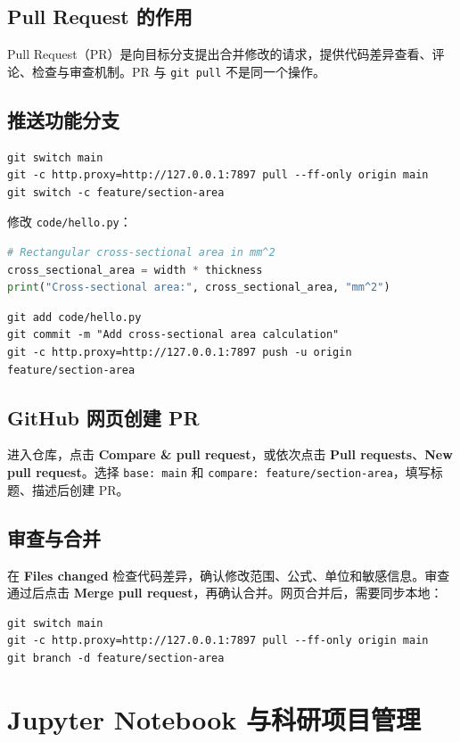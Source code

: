 \subsection{Pull Request 的作用}
Pull Request（PR）是向目标分支提出合并修改的请求，提供代码差异查看、评论、检查与审查机制。PR 与 \texttt{git pull} 不是同一个操作。
\subsection{推送功能分支}
\begin{lstlisting}
git switch main
git -c http.proxy=http://127.0.0.1:7897 pull --ff-only origin main
git switch -c feature/section-area
\end{lstlisting}
修改 \texttt{code/hello.py}：
\begin{lstlisting}[language=Python]
# Rectangular cross-sectional area in mm^2
cross_sectional_area = width * thickness
print("Cross-sectional area:", cross_sectional_area, "mm^2")
\end{lstlisting}
\begin{lstlisting}
git add code/hello.py
git commit -m "Add cross-sectional area calculation"
git -c http.proxy=http://127.0.0.1:7897 push -u origin feature/section-area
\end{lstlisting}
\subsection{GitHub 网页创建 PR}
进入仓库，点击 \textbf{Compare \& pull request}，或依次点击 \textbf{Pull requests}、\textbf{New pull request}。选择 \texttt{base: main} 和 \texttt{compare: feature/section-area}，填写标题、描述后创建 PR。
\subsection{审查与合并}
在 \textbf{Files changed} 检查代码差异，确认修改范围、公式、单位和敏感信息。审查通过后点击 \textbf{Merge pull request}，再确认合并。网页合并后，需要同步本地：
\begin{lstlisting}
git switch main
git -c http.proxy=http://127.0.0.1:7897 pull --ff-only origin main
git branch -d feature/section-area
\end{lstlisting}

\section{Jupyter Notebook 与科研项目管理}

